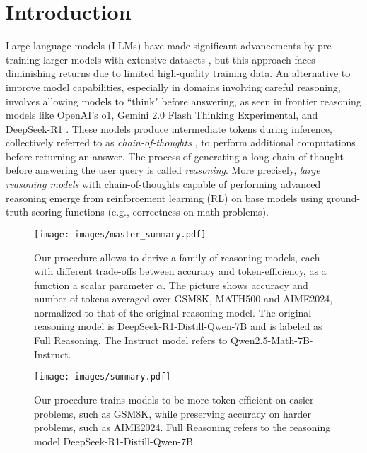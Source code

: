\section{Introduction}
Large language models (LLMs) have made significant advancements by pre-training larger models with extensive datasets \citep{kaplan2020scaling}, but this approach faces diminishing returns due to limited high-quality training data.
An alternative to improve model capabilities, especially in domains involving careful reasoning, involves allowing models to ``think" before answering, as seen in frontier reasoning models like OpenAI's o1, Gemini 2.0 Flash Thinking Experimental, and DeepSeek-R1 \citep{guo2025deepseek}. These models produce intermediate tokens during inference, collectively referred to as \emph{chain-of-thoughts} \citep{wei2022chain}, to perform additional computations before returning an answer. The process of generating a long chain of thought before answering the user query is called \emph{reasoning}.
More precisely, \emph{large reasoning models} with chain-of-thoughts capable of performing advanced reasoning emerge from reinforcement learning (RL) \citep{sutton2018reinforcement, guo2025deepseek} on base models using ground-truth scoring functions (e.g., correctness on math problems). 

\begin{figure}[t]
\centering
\texttt{[image: images/master\_summary.pdf]}
\vspace{-2em}
  \caption{Our procedure allows to derive a family of reasoning models, each with different trade-offs between accuracy and token-efficiency, as a function a scalar parameter $\alpha$. The picture shows accuracy and number of tokens averaged over GSM8K, MATH500 and AIME2024, normalized to that of the original reasoning model. The original reasoning model is  DeepSeek-R1-Distill-Qwen-7B and is labeled  as Full Reasoning. The Instruct model refers to Qwen2.5-Math-7B-Instruct.}
  \label{fig:master_summary}
\end{figure}


\begin{figure*}[h!]
\centering
\texttt{[image: images/summary.pdf]}
\vspace{-2em}
  \caption{Our procedure trains models to be more token-efficient on easier problems, such as GSM8K, while preserving accuracy on harder problems, such as AIME2024. Full Reasoning refers to the  reasoning model DeepSeek-R1-Distill-Qwen-7B.}
  \label{fig:summary}
\end{figure*}

